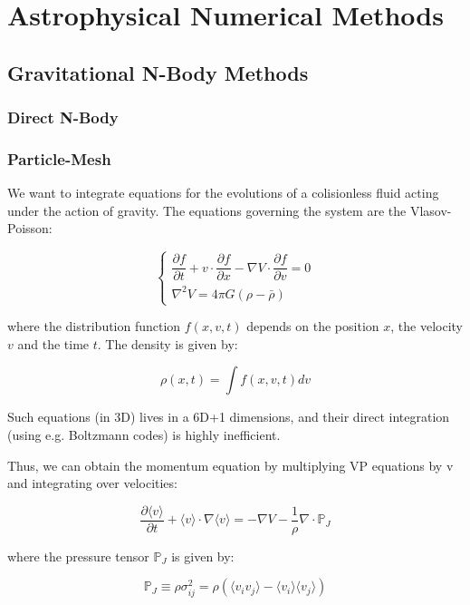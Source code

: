 \chapter{Astrophysical Numerical Methods}

\section{Gravitational N-Body Methods}


\subsection{Direct N-Body}


\newpage

\subsection{Particle-Mesh}


We want to integrate equations for the evolutions of a colisionless fluid acting under the action of gravity. The equations governing the system are the Vlasov-Poisson:

$$
\begin{cases}
    \dfrac{\partial f}{\partial t} + v \cdot \dfrac{\partial f}{\partial x} - \nabla V \cdot \dfrac{\partial f}{\partial v} = 0 \\
    \nabla^2 V = 4\pi G (\rho - \bar \rho)
\end{cases}
$$

where the distribution function $f(x, v, t)$ depends on the position $x$, the velocity $v$ and the time $t$. The density is given by:

$$
\rho(x, t) = \int f(x, v, t) dv
$$

Such equations (in 3D) lives in a 6D+1 dimensions, and their direct integration (using e.g. Boltzmann codes) is highly inefficient.

Thus, we can obtain the momentum equation by multiplying VP equations by v and integrating over velocities:

$$
\dfrac{\partial \langle v \rangle}{\partial t} + \langle v \rangle \cdot \nabla \langle v \rangle = - \nabla V - \dfrac{1}{\rho} \nabla \cdot \mathbb{P}_J
$$

where the pressure tensor $\mathbb{P}_J$ is given by:

$$
\mathbb{P}_J \equiv \rho \sigma^2_{ij} = \rho (\langle v_i v_j \rangle - \langle v_i \rangle \langle v_j \rangle)
$$


